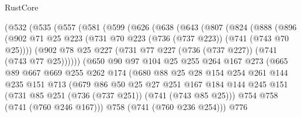 \begin{lexlean}{RustCore}
\begin{coremodule}
        (@532
          (@535
            (@557
              (@581
                (@599
                  (@626
                    (@638
                      (@643
                        (@807
                          (@824
                            (@888
                              (@896
                                (@902
                                  @71
                                  @25
                                  @223
                                  (@731 @70 @223 (@736 (@737 @223)) (@741 (@743 @70 @25))))
                                (@902
                                  @78
                                  @25
                                  @227
                                  (@731 @77 @227 (@736 (@737 @227)) (@741 (@743 @77 @25))))))
                            (@650
                              @90
                              @97
                              @104
                              @25
                              @255
                              @264
                              @167
                              @273
                              (@665
                                @89
                                @667
                                @669
                                @255
                                @262
                                @174
                                (@680
                                  @88
                                  @25
                                  @28
                                  @154
                                  @254
                                  @261
                                  @144
                                  @235
                                  @151
                                  @713
                                  (@679
                                    @86
                                    @50
                                    @25
                                    @27
                                    @251
                                    @167
                                    @184
                                    @144
                                    @245
                                    @151
                                    (@731 @85 @251 (@736 (@737 @251)) (@741 (@743 @85 @25)))
                                    @754
                                    @758
                                    (@741 (@760 @246 @167)))
                                  @758
                                  (@741 (@760 @236 @254)))
                                @776

\end{coremodule}
\end{lexlean}

